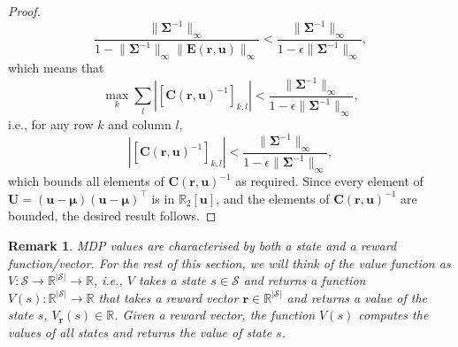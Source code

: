 \documentclass{mpaper}
\newtheorem{remark}[theorem]{Remark}
\newcommand{\V}{V_{\mathbf{r}}}
\begin{document}
\begin{proof}
\[    \frac{\lVert \bm\Sigma^{-1} \rVert_\infty}{1 - \lVert \bm\Sigma^{-1}
      \rVert_\infty \lVert \mathbf{E}(\mathbf{r}, \mathbf{u}) \rVert_\infty} <
    \frac{\lVert \bm\Sigma^{-1} \rVert_\infty}{1 - \epsilon \lVert
      \bm\Sigma^{-1} \rVert_\infty},
  \]
  which means that
  \[
    \max_k \sum_l \left| [\mathbf{C}(\mathbf{r}, \mathbf{u})^{-1}]_{k,l} \right|
    < \frac{\lVert \bm\Sigma^{-1} \rVert_\infty}{1 - \epsilon \lVert
      \bm\Sigma^{-1} \rVert_\infty},
  \]
  i.e., for any row $k$ and column $l$,
  \[
    \left| [\mathbf{C}(\mathbf{r}, \mathbf{u})^{-1}]_{k,l} \right| <
    \frac{\lVert \bm\Sigma^{-1} \rVert_\infty}{1 - \epsilon \lVert
      \bm\Sigma^{-1} \rVert_\infty},
  \]
  which bounds all elements of $\mathbf{C}(\mathbf{r}, \mathbf{u})^{-1}$ as
  required. Since every element of $\mathbf{U} = (\mathbf{u} - \bm\mu)(\mathbf{u} -
  \bm\mu)^\intercal$ is in $\mathbb{R}_2[\mathbf{u}]$, and the elements of
  $\mathbf{C}(\mathbf{r}, \mathbf{u})^{-1}$ are bounded, the desired result
  follows.
\end{proof}

\begin{remark}
  MDP values are characterised by both a state and a reward function/vector. For
  the rest of this section, we will think of the value function as $V :
  \mathcal{S} \to \mathbb{R}^{|\mathcal{S}|} \to \mathbb{R}$, i.e., $V$ takes a
  state $s \in \mathcal{S}$ and returns a function $V(s) :
  \mathbb{R}^{|\mathcal{S}|} \to \mathbb{R}$ that takes a reward vector
  $\mathbf{r} \in \mathbb{R}^{|\mathcal{S}|}$ and returns a value of the state
  $s$, $\V(s) \in \mathbb{R}$. Given a reward vector, the function $V(s)$
  computes the values of all states and returns the value of state $s$.
\end{remark}
\end{document}
